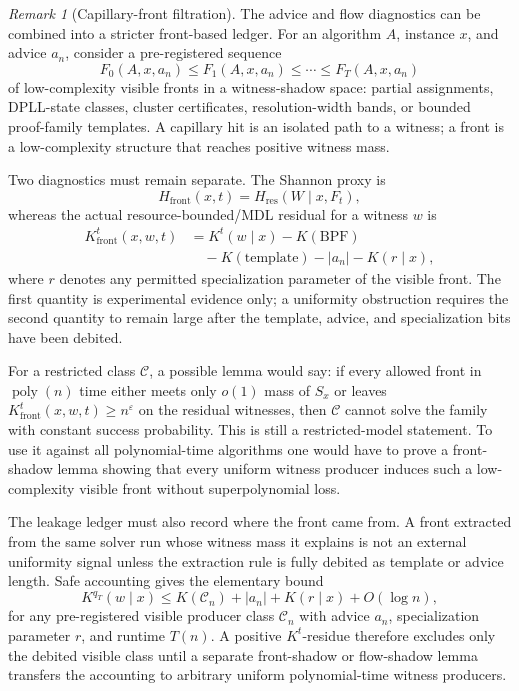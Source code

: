 \documentclass[aps,prd,twocolumn,superscriptaddress,nofootinbib]{revtex4-2}
\theoremstyle{definition}
\theoremstyle{remark}
\newtheorem{remark}[theorem]{Remark}
\DeclareMathOperator{\poly}{poly}
\begin{document}
\begin{remark}[Capillary-front filtration]\label{rem:capillary-front}
The advice and flow diagnostics can be combined into a stricter front-based
ledger.  For an algorithm $A$, instance $x$, and advice $a_n$, consider a
pre-registered sequence
\[
F_0(A,x,a_n)\leq F_1(A,x,a_n)\leq\cdots\leq F_T(A,x,a_n)
\]
of low-complexity visible fronts in a witness-shadow space: partial
assignments, DPLL-state classes, cluster certificates, resolution-width
bands, or bounded proof-family templates.  A capillary hit is an isolated
path to a witness; a front is a low-complexity structure that reaches
positive witness mass.

Two diagnostics must remain separate.  The Shannon proxy is
\[
H_{\mathrm{front}}(x,t)=H_{\mathrm{res}}(W\mid x,F_t),
\]
whereas the actual resource-bounded/MDL residual for a witness $w$ is
\[
\begin{aligned}
K_{\mathrm{front}}^t(x,w,t)
  &=K^t(w\mid x)-K(\mathrm{BPF})\\
  &\quad -K(\mathrm{template})-|a_n|-K(r\mid x),
\end{aligned}
\]
where $r$ denotes any permitted specialization parameter of the visible
front.  The first quantity is experimental evidence only; a uniformity
obstruction requires the second quantity to remain large after the template,
advice, and specialization bits have been debited.

For a restricted class $\mathcal{C}$, a possible lemma would say: if every
allowed front in $\poly(n)$ time either meets only $o(1)$ mass of $S_x$ or
leaves $K_{\mathrm{front}}^t(x,w,t)\geq n^\varepsilon$ on the residual
witnesses, then $\mathcal{C}$ cannot solve the family with constant success
probability.  This is still a restricted-model statement.  To use it against
all polynomial-time algorithms one would have to prove a front-shadow lemma
showing that every uniform witness producer induces such a low-complexity
visible front without superpolynomial loss.

The leakage ledger must also record where the front came from.  A front
extracted from the same solver run whose witness mass it explains is not an
external uniformity signal unless the extraction rule is fully debited as
template or advice length.  Safe accounting gives the elementary bound
\[
K^{q_T}(w\mid x)\leq K(\mathcal{C}_n)+|a_n|+K(r\mid x)+O(\log n),
\]
for any pre-registered visible producer class $\mathcal{C}_n$ with advice
$a_n$, specialization parameter $r$, and runtime $T(n)$.  A positive
$K^t$-residue therefore excludes only the debited visible class until a
separate front-shadow or flow-shadow lemma transfers the accounting to
arbitrary uniform polynomial-time witness producers.
\end{remark}
\end{document}

